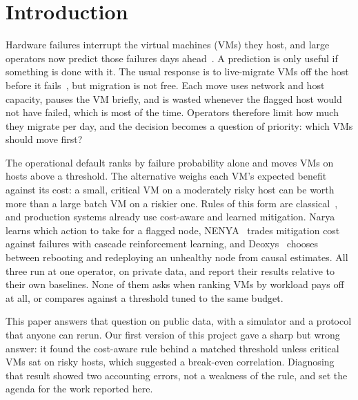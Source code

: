 \documentclass[pdflatex,sn-mathphys-num,iicol]{sn-jnl}
\theoremstyle{thmstyleone}%
\theoremstyle{thmstylethree}%
\begin{document}
\section{Introduction}\label{sec:intro}

Hardware failures interrupt the virtual machines (VMs) they host, and large operators now predict
those failures days ahead~\cite{levy2020narya,lin2018ming,xu2018cdef}. A prediction is only useful
if something is done with it. The usual response is to live-migrate VMs off the host before it
fails~\cite{clark2005live}, but migration is not free. Each move uses network and host capacity,
pauses the VM briefly, and is wasted whenever the flagged host would not have failed, which is
most of the time. Operators therefore limit how much they migrate per day, and the decision
becomes a question of priority: which VMs should move first?

The operational default ranks by failure probability alone and moves VMs on hosts above a
threshold. The alternative weighs each VM's expected benefit against its cost: a small, critical
VM on a moderately risky host can be worth more than a large batch VM on a riskier one. Rules of
this form are classical~\cite{elkan2001foundations,dantzig1957discrete}, and production systems
already use cost-aware and learned mitigation. Narya~\cite{levy2020narya} learns which action to
take for a flagged node, NENYA~\cite{wang2022nenya} trades mitigation cost against failures with
cascade reinforcement learning, and Deoxys~\cite{zhang2024deoxys} chooses between rebooting and
redeploying an unhealthy node from causal estimates. All three run at one operator, on private
data, and report their results relative to their own baselines. None of them asks when ranking
VMs by workload pays off at all, or compares against a threshold tuned to the same budget.

This paper answers that question on public data, with a simulator and a protocol that anyone can
rerun. Our first version of this project gave a sharp but wrong answer: it found the cost-aware
rule behind a matched threshold unless critical VMs sat on risky hosts, which suggested a
break-even correlation. Diagnosing that result showed two accounting errors, not a weakness of the
rule, and set the agenda for the work reported here.
\end{document}
